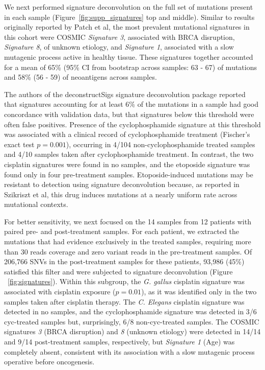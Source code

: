 We next performed signature deconvolution on the full set of mutations present in each sample (Figure~\ref{fig:supp_signatures} top and middle). Similar to results originally reported by Patch et al, the most prevalent mutational signatures in this cohort were COSMIC \textit{Signature 3}, associated with BRCA disruption, \textit{Signature 8}, of unknown etiology, and \textit{Signature 1}, associated with a slow mutagenic process active in healthy tissue. These signatures together accounted for a mean of 65\% (95\% CI from bootstrap across samples: 63 - 67) of mutations and 58\% (56 - 59) of neoantigens across samples.

The authors of the deconstructSigs signature deconvolution package reported that signatures accounting for at least 6\% of the mutations in a sample had good concordance with validation data, but that signatures below this threshold were often false positives. Presence of the cyclophosphamide signature at this threshold was associated with a clinical record of cyclophosphamide treatment (Fischer's exact test $p = 0.001$), occurring in 4/104 non-cyclophosphamide treated samples and 4/10 samples taken after cyclophosphamide treatment. In contrast, the two cisplatin signatures were found in no samples, and the etoposide signature was found only in four pre-treatment samples. Etoposide-induced mutations may be resistant to detection using signature deconvolution because, as reported in Szikriszt et al, this drug induces mutations at a nearly uniform rate across mutational contexts. 


For better sensitivity, we next focused on the 14 samples from 12 patients with paired pre- and post-treatment samples. For each patient, we extracted the mutations that had evidence exclusively in the treated samples, requiring more than 30 reads coverage and zero variant reads in the pre-treatment samples. Of 206,766 SNVs in the post-treatment samples for these patients, 93,986 (45\%) satisfied this filter and were subjected to signature deconvolution (Figure ~\ref{fig:signatures}). Within this subgroup, the \textit{G. gallus} cisplatin signature was associated with cisplatin exposure ($p = 0.01$), as it was identified only in the two samples taken after cisplatin therapy. The \textit{C. Elegans} cisplatin signature was detected in no samples, and the cyclophosphamide signature was detected in 3/6 cyc-treated samples but, surprisingly, 6/8 non-cyc-treated samples. The COSMIC signatures \textit{3} (BRCA disruption) and \textit{8} (unknown etiology) were detected in 14/14 and 9/14 post-treatment samples, respectively, but \textit{Signature 1} (Age) was completely absent, consistent with its association with a slow mutagenic process operative before oncogenesis.

